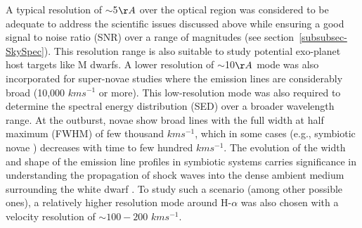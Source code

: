 \par 
A typical resolution of $\sim$5$\AA$ over the optical region was considered to be adequate to address the scientific issues discussed above while ensuring a good signal to noise ratio (SNR) over a range of magnitudes (see section~\ref{subsubsec-SkySpec}). This resolution range is also suitable to study potential exo-planet host targets like M dwarfs. A lower resolution of $\sim$10$\AA$ mode was also incorporated for super-novae studies where the emission lines are considerably broad (10,000 $kms^{-1}$ or more). This low-resolution mode was also required to determine the spectral energy distribution (SED) over a broader wavelength range. At the outburst, novae show broad lines with the full width at half maximum (FWHM) of few thousand $kms^{-1}$, which in some cases (e.g., symbiotic novae \citep{Srivastava2015}) decreases with time to few hundred $kms^{-1}$. The evolution of the width and shape of the emission line profiles in symbiotic systems carries significance in understanding the propagation of shock waves into the dense ambient medium surrounding the white dwarf \citep{Bode1985}. To study such a scenario (among other possible ones), a relatively higher resolution mode around H-$\alpha$ was also chosen with a velocity resolution of $\sim100-200$ $kms^{-1}$.
\par 
